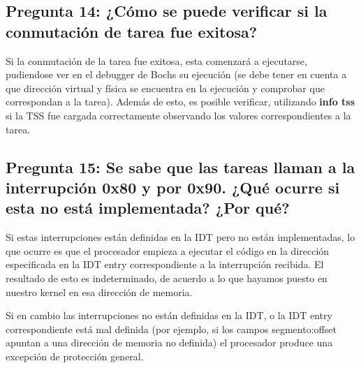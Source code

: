\documentclass[a4paper,10pt,twoside]{article}
\begin{document}
\subsection{Pregunta 14: ¿Cómo se puede verificar si la conmutación de tarea fue exitosa?}
Si la conmutación de la tarea fue exitosa, esta comenzará a ejecutarse, pudiendose ver en el debugger de Bochs su ejecución (se debe tener en cuenta a que dirección virtual y física se encuentra en la ejecución y comprobar que correspondan a la tarea). Además de esto, es posible verificar, utilizando \textbf{info tss} si la TSS fue cargada correctamente observando los valores correspondientes a la tarea.


\subsection{Pregunta 15: Se sabe que las tareas llaman a la interrupción 0x80 y por 0x90. ¿Qué ocurre si esta no está implementada? ¿Por qué?}

Si estas interrupciones están definidas en la IDT pero no están implementadas, lo que ocurre es que el procesador empieza a ejecutar el código en la dirección especificada en la IDT entry correspondiente a la interrupción recibida. El resultado de esto es indeterminado, de acuerdo a lo que hayamos puesto en nuestro kernel en esa dirección de memoria.

Si en cambio las interrupciones no están definidas en la IDT, o la IDT entry correspondiente está mal definida (por ejemplo, si los campos segmento:offset apuntan a una dirección de memoria no definida) el procesador produce una excepción de protección general.
\end{document}
